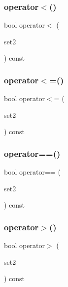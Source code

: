 \mbox{\label{classSet_a0dc952ee4c46dc337141d6bc7749ae09}} 
\subsubsection{\texorpdfstring{operator$<$()}{operator<()}}
{\footnotesize\ttfamily bool operator$<$ (\begin{DoxyParamCaption}\item[{const \mbox{\hyperlink{classSet}{Set}}$<$ Value\+Type $>$ \&}]{set2 }\end{DoxyParamCaption}) const}

\mbox{\label{classSet_a5fa22b91eacd2a4991642e4d92ab5024}} 
\subsubsection{\texorpdfstring{operator$<$=()}{operator<=()}}
{\footnotesize\ttfamily bool operator$<$= (\begin{DoxyParamCaption}\item[{const \mbox{\hyperlink{classSet}{Set}}$<$ Value\+Type $>$ \&}]{set2 }\end{DoxyParamCaption}) const}

\mbox{\label{classSet_a5cb3d35ea437e5d1a2e7b9c2542756ad}} 
\subsubsection{\texorpdfstring{operator==()}{operator==()}}
{\footnotesize\ttfamily bool operator== (\begin{DoxyParamCaption}\item[{const \mbox{\hyperlink{classSet}{Set}}$<$ Value\+Type $>$ \&}]{set2 }\end{DoxyParamCaption}) const}

\mbox{\label{classSet_a03e2d0f31abc1d4fb14085cc3be47f4d}} 
\subsubsection{\texorpdfstring{operator$>$()}{operator>()}}
{\footnotesize\ttfamily bool operator$>$ (\begin{DoxyParamCaption}\item[{const \mbox{\hyperlink{classSet}{Set}}$<$ Value\+Type $>$ \&}]{set2 }\end{DoxyParamCaption}) const}

